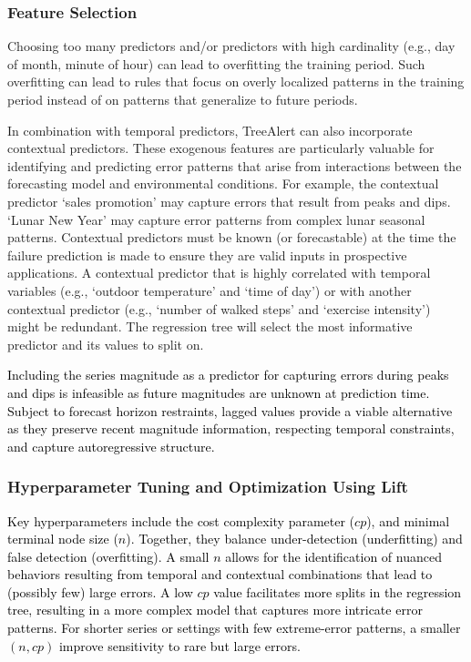 \documentclass[]{interact}
\theoremstyle{plain}
\theoremstyle{definition}
\theoremstyle{remark}
\newcommand{\matt}[1]{\textcolor{black}{#1}}
\begin{document}
\subsubsection{Feature Selection}

Choosing too many predictors and/or predictors with high cardinality (e.g., day of month,
minute of hour) can lead to overfitting the training period. Such overfitting can lead to
rules that focus on overly localized patterns in the training period instead of on patterns
that generalize to future periods.

In combination with temporal predictors, TreeAlert can also incorporate contextual
predictors. These exogenous features are particularly valuable for identifying and predicting
error patterns that arise from interactions between the forecasting model and environmental
conditions. For example, the contextual predictor `sales promotion' may capture errors that
result from peaks and dips. `Lunar New Year' may capture error patterns from complex lunar
seasonal patterns. Contextual predictors must be known (or forecastable) at the time the
failure prediction is made to ensure they are valid inputs in prospective applications. A
contextual predictor that is highly correlated with temporal variables (e.g., `outdoor
temperature' and `time of day') or with another contextual predictor (e.g., `number of
walked steps' and `exercise intensity') might be redundant. The regression tree will select
the most informative predictor and its values to split on.

\matt{Including the series magnitude as a predictor for capturing errors during peaks and
dips is infeasible as future magnitudes are unknown at prediction time. Subject to forecast
horizon restraints, lagged values provide a viable alternative as they preserve recent
magnitude information, respecting temporal constraints, and capture autoregressive structure.}

\subsubsection{Hyperparameter Tuning and Optimization Using Lift}
\label{sec:tuning_optimization}

\matt{Key hyperparameters include the cost complexity parameter ($cp$), and minimal terminal
node size ($n$). Together, they balance under-detection (underfitting) and false detection
(overfitting). A small $n$ allows for the identification of nuanced behaviors resulting from
temporal and contextual combinations that lead to (possibly few) large errors. A low $cp$
value facilitates more splits in the regression tree, resulting in a more complex model that
captures more intricate error patterns. For shorter series or settings with few
extreme-error patterns, a smaller $(n, cp)$ improve sensitivity to rare but large errors.}
\end{document}

